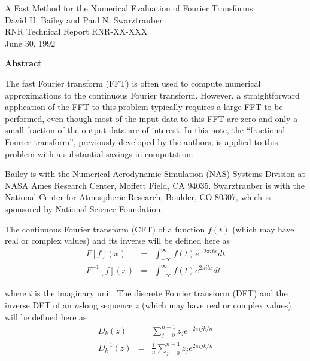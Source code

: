 \setlength{\oddsidemargin}{0cm}
\setlength{\textwidth}{16.2cm}
\setlength{\columnwidth}{16.2cm}
\setlength{\topmargin}{0cm}
\setlength{\textheight}{21.5cm}



\vspace*{2.7cm}
\begin{large} \begin{center}
A Fast Method for the Numerical Evaluation of Fourier Transforms \\ 
David H. Bailey and Paul N. Swarztrauber \\ 
RNR Technical Report RNR-XX-XXX \\
June 30, 1992
\end{center} \end{large}

\vspace{3ex} \noindent
{\bf Abstract}

The fast Fourier transform (FFT) is often used to compute numerical
approximations to the continuous Fourier transform.  However, a
straightforward application of the FFT to this problem typically
requires a large FFT to be performed, even though most of the input
data to this FFT are zero and only a small fraction of the output data
are of interest.  In this note, the ``fractional Fourier transform'',
previously developed by the authors, is applied to this problem with a
substantial savings in computation.

\vfill{
Bailey is with the Numerical Aerodynamic Simulation (NAS) Systems
Division at NASA Ames Research Center, Moffett Field, CA 94035.
Swarztrauber is with the National Center for Atmospheric Research,
Boulder, CO 80307, which is sponsored by National Science Foundation.}

\newpage
{}

The continuous Fourier transform (CFT) of a function $f(t)$ (which may
have real or complex values) and its inverse will be defined here as
\begin{eqnarray}
F[f](x) &=& \int _{-\infty} ^\infty f(t) e^{-2 \pi i t x} dt \\
F^{-1}[f](x) &=& \int _{-\infty} ^\infty f(t) e^{2 \pi i t x} dt
\end{eqnarray}

\noindent
where $i$ is the imaginary unit.  The discrete Fourier transform (DFT)
and the inverse DFT of an $n$-long sequence $z$ (which may have real
or complex values) will be defined here as
\begin{eqnarray}
D_k (z) &=& \sum _{j = 0} ^{n - 1} z_j e^{-2 \pi i j k / n} \\
D_k^{-1} (z) &=& \frac{1}{n} \sum _{j = 0} ^{n - 1} z_j e^{2 \pi i j k / n}
\end{eqnarray}

